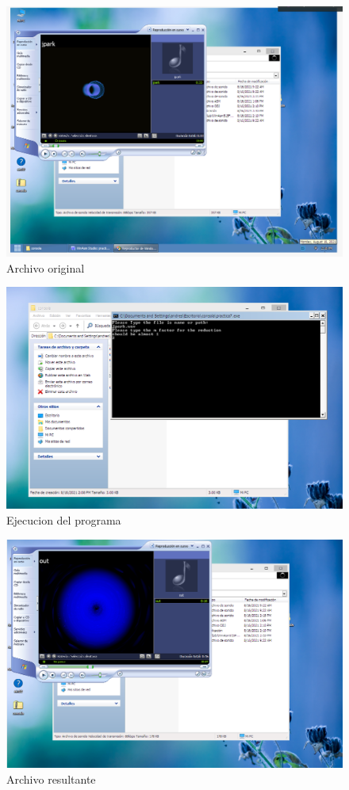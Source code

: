 \begin{figure}[H]
  \includegraphics[width=\linewidth]{practica7/img/fig1}
    \caption{Archivo original}
\end{figure}

\begin{figure}[H]
  \includegraphics[width=\linewidth]{practica7/img/fig2}
    \caption{Ejecucion del programa}
\end{figure}

\begin{figure}[H]
  \includegraphics[width=\linewidth]{practica7/img/fig3}
    \caption{Archivo resultante}
\end{figure}

